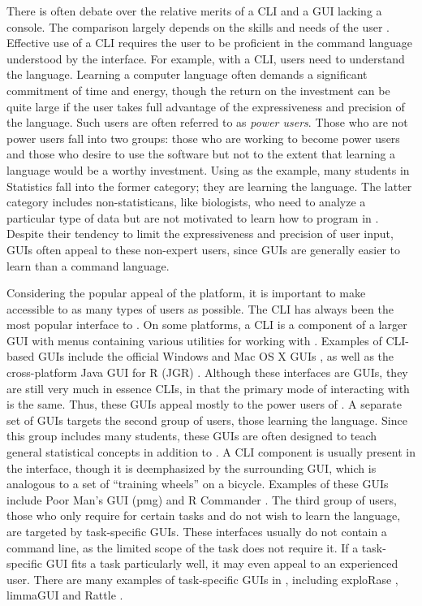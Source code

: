 \documentclass[article]{jss}
\begin{document}
There is often debate over the relative merits of a CLI and a GUI lacking a console. 
The comparison largely
depends on the skills and needs of the user \citep{gui-cli}. Effective use of a
CLI requires the user to be proficient in the command language understood by the
interface. For example, with a CLI,  users need to understand the 
 language. Learning a computer language often demands a significant
commitment of time and energy, though the return on the investment can be quite
large if the user takes full advantage of the expressiveness and precision of 
the language. Such users are often referred to as \emph{power users}. Those who 
are not power users fall into two groups: those who are working to become power
users and those who desire to use the software but not to the extent that learning a
language would be a worthy investment. Using
 as the example, many students in Statistics fall into the former 
category; they are learning the  language. The latter category includes 
non-statisticans, like biologists, who need to analyze a particular
type of data but are not motivated to learn how to program in . 
Despite their tendency to limit the expressiveness and precision of user input, 
GUIs often appeal to these non-expert users, since GUIs are generally easier
to learn than a command language.

Considering the popular appeal of the  platform,
it is important to make  accessible to as many types of users as possible.
The CLI has always been the most popular interface to . 
On some platforms, a CLI is a component of a larger 
GUI with menus containing various utilities for working
with . Examples of CLI-based  GUIs include the official
Windows and Mac OS X GUIs \citep{Mac-GUI}, as well as the cross-platform 
Java GUI for R (JGR) \citep{JGR}. Although these interfaces are GUIs, they are 
still very much in essence CLIs, in that the primary mode of interacting with 
 is the same. Thus, these GUIs appeal mostly to the power users of .
A separate set of GUIs targets the second group of users, those learning the 
 language. Since this group includes many students, these GUIs are
often designed to teach general statistical concepts in addition to .
A CLI component is usually present in the interface, though it is
deemphasized by the surrounding GUI, which is analogous to a set of 
``training wheels'' on a bicycle. Examples of these GUIs include 
Poor Man's GUI (pmg) \citep{pmg} and R Commander \citep{rcmndr}. The third 
group of users, those who only require  for certain tasks and 
do not wish to learn the language, are targeted by task-specific GUIs. These 
interfaces usually do not contain a command line, as the limited scope of the
task does not require it. If a task-specific GUI fits a task particularly well,
it may even appeal to an experienced user. There are many examples of 
task-specific GUIs in , including
exploRase \citep{explorase}, limmaGUI \citep{Limma} and Rattle \citep{rattle}.
\end{document}
